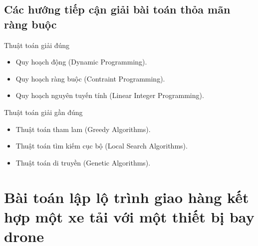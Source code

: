 \documentclass[compress]{beamer}
\begin{document}
\subsection{Các hướng tiếp cận giải bài toán thỏa mãn ràng buộc}
\begin{frame}{Thuật toán giải đúng}
\begin{itemize}
\item Quy hoạch động (Dynamic Programming).
\item Quy hoạch ràng buộc (Contraint Programming).
\item Quy hoạch nguyên tuyến tính (Linear Integer Programming).
\end{itemize}
\end{frame}
\begin{frame}{Thuật toán giải gần đúng}
\begin{itemize}
\item Thuật toán tham lam (Greedy Algorithms).
\item Thuật toán tìm kiếm cục bộ (Local Search Algorithms).
\item Thuật toán di truyền (Genetic Algorithms).
\end{itemize}

\end{frame}
\section{Bài toán lập lộ trình giao hàng kết hợp một xe tải với một thiết bị bay drone}
\end{document}
